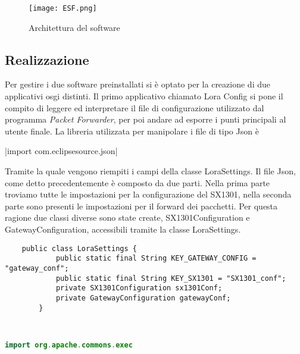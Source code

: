\begin{figure}[h]
\centering 
\texttt{[image: ESF.png]}
\caption{Architettura del software}
\label{fig:Software_stack}
\end{figure}

\subsection{Realizzazione}
Per gestire i due software preinstallati si è optato per la creazione di due
applicativi osgi distinti.
Il primo applicativo chiamato Lora Config si pone il compito di leggere ed
interpretare il file di configurazione utilizzato dal programma \emph{Packet
Forwarder}, per poi andare ad esporre i punti principali al utente finale.
La libreria utilizzata per manipolare i file di tipo Json è 

|import com.eclipsesource.json|

Tramite la quale vengono riempiti i campi della classe LoraSettings. Il file
Json, come detto precedentemente è composto da due parti. Nella prima parte
troviamo tutte le impostazioni per la configurazione del SX1301, nella seconda
parte sono presenti le impostazioni per il forward dei pacchetti. Per questa
ragione due classi diverse sono state create, SX1301Configuration e
GatewayConfiguration, accessibili tramite la classe LoraSettings.

\begin{verbatim}
    public class LoraSettings {
            public static final String KEY_GATEWAY_CONFIG = "gateway_conf";
            public static final String KEY_SX1301 = "SX1301_conf";
            private SX1301Configuration sx1301Conf;
            private GatewayConfiguration gatewayConf;
        }
\end{verbatim}

\begin{lstlisting}[language=Java, frame=single]  % Start your code-block


import org.apache.commons.exec

\end{lstlisting}
